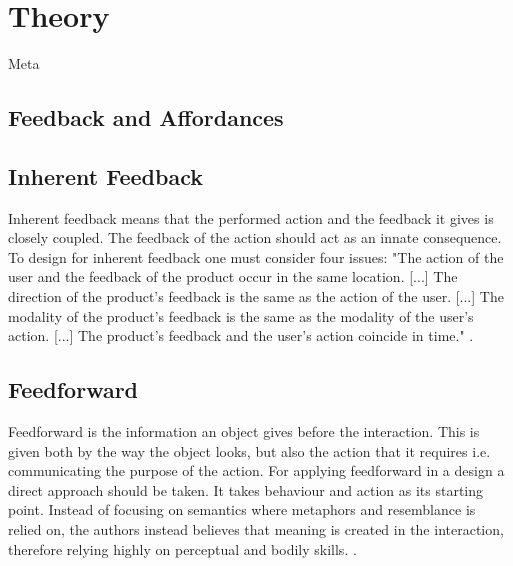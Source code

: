 \chapter{Theory}

Meta

\section{Feedback and Affordances}
\cite{norman} \cite{fullerton}

\section{Inherent Feedback}
Inherent feedback means that the performed action and the feedback it gives is closely coupled. The feedback of the action should act as an innate consequence. To design for inherent feedback one must consider four issues: "The action of the user and the feedback of the product occur in the
same location. [...] The direction of the product's feedback is the same as the action of
the user. [...] The modality of the product's feedback is the same as the modality
of the user's action. [...] The product's feedback and the user's action coincide in time." \cite{howdonald}.

\cite{frogger}
\section{Feedforward}
Feedforward is the information an object gives before the interaction. This is given both by the way the object looks, but also the action that it requires i.e. communicating the purpose of the action. For applying feedforward in a design a direct approach should be taken. It takes behaviour and action as its starting point. Instead of focusing on semantics where metaphors and resemblance is relied on, the authors instead believes that meaning is created in the interaction, therefore relying highly on perceptual and bodily skills. \cite{howdonald}.

